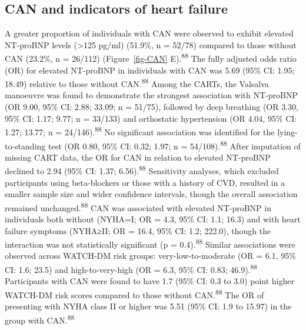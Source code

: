 \documentclass[
  a4paper,
  headsepline=true,
  open=left]{scrbook}
\begin{document}
\restoregeometry

\hypertarget{can-and-indicators-of-heart-failure}{%
\subsection{CAN and indicators of heart
failure}\label{can-and-indicators-of-heart-failure}}

A greater proportion of individuals with CAN were observed to exhibit
elevated NT-proBNP levels (\textgreater125 pg/ml) (51.9\%, n = 52/78)
compared to those without CAN (23.2\%, n = 26/112) (Figure~\ref{fig-CAN}
E).\textsuperscript{88} The fully adjusted odds ratio (OR) for elevated
NT-proBNP in individuals with CAN was 5.69 (95\% CI: 1.95; 18.49)
relative to those without CAN.\textsuperscript{88} Among the CARTs, the
Valsalva manoeuvre was found to demonstrate the strongest association
with NT-proBNP (OR 9.00, 95\% CI: 2.88; 33.09; n = 51/75), followed by
deep breathing (OR 3.30, 95\% CI: 1.17; 9.77; n = 33/133) and
orthostatic hypertension (OR 4.04, 95\% CI: 1.27; 13.77; n =
24/146).\textsuperscript{88} No significant association was identified
for the lying-to-standing test (OR 0.80, 95\% CI: 0.32; 1.97; n =
54/108).\textsuperscript{88} After imputation of missing CART data, the
OR for CAN in relation to elevated NT-proBNP declined to 2.94 (95\% CI:
1.37; 6.56).\textsuperscript{88} Sensitivity analyses, which excluded
participants using beta-blockers or those with a history of CVD,
resulted in a smaller sample size and wider confidence intervals, though
the overall association remained unchanged.\textsuperscript{88} CAN was
associated with elevated NT-proBNP in individuals both without (NYHA=I;
OR = 4.3, 95\% CI: 1.1; 16.3) and with heart failure symptoms (NYHA≥II;
OR = 16.4, 95\% CI: 1.2; 222.0), though the interaction was not
statistically significant (p = 0.4).\textsuperscript{88} Similar
associations were observed across WATCH-DM risk groups:
very-low-to-moderate (OR = 6.1, 95\% CI: 1.6; 23.5) and
high-to-very-high (OR = 6.3, 95\% CI: 0.83; 46.9).\textsuperscript{88}
Participants with CAN were found to have 1.7 (95\% CI: 0.3 to 3.0) point
higher WATCH-DM risk scores compared to those without
CAN.\textsuperscript{88} The OR of presenting with NYHA class II or
higher was 5.51 (95\% CI: 1.9 to 15.97) in the group with
CAN.\textsuperscript{88}

\end{document}
